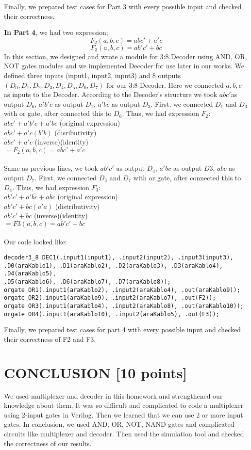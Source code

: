 \documentclass[pdftex,12pt,a4paper]{article}
\begin{document}
Finally, we prepared test cases for Part 3 with every possible input and checked their correctness. 

\textbf{In Part 4}, we had two expression;
\[F_2(a, b, c) = abc' + a'c\]
\[F_3(a, b, c) = ab'c'+ bc\]
In this section, we designed and wrote a module for 3:8 Decoder using AND, OR, NOT gates modules and we implemented Decoder for use later in our works. We defined three inputs (input1, input2, input3) and 8 outputs \((D_0, D_1, D_2, D_3, D_4, D_5, D_6, D_7)\) for our 3:8 Decoder. 
Here we connected \(a, b, c\) as inputs to the Decoder. According to the Decoder’s structure we took \(abc' \)as output \(D_6\), \(a' b'c\) as output \(D_1\), \(a' bc\) as output \(D_3\). First, we connected \(D_1\)  and \(D_3\)  with or gate, after connected this to \(D_6\). Thus, we had expression \(F_2\):\\
	\(abc' + a' b'c + a' bc\)		(original expression)\\
	\(abc' + a'c(b'b)\)					(disributivity)\\
	\(abc' + a'c \)					(inverse)(identity)\\
\(=F_2(a, b, c) = abc' + a'c\)	\\\\
Same as previous lines, we took \(ab'c'\) as output \(D_4\), \(a' bc\) as output \(D3\), \(abc\) as output \(D_7\). First, we connected \(D_3\) and \(D_7\) with or gate, after connected this to \(D_4\). Thus, we had expression \(F_3\):\\
\(ab'c'+ a'bc + abc\)			(original expression)\\
\(ab'c'+ bc(a'a)	\)			(distributivity)\\
\(ab'c'+ bc	\)			(inverse)(identity)\\
\(= 	F3(a, b, c) = ab'c'+ bc\)\\\\
 Our code looked like:

\begin{verbatim}
decoder3_8 DEC1(.input1(input1), .input2(input2), .input3(input3),
.D0(araKablo1), .D1(araKablo2), .D2(araKablo3), .D3(araKablo4), .D4(araKablo5),
.D5(araKablo6), .D6(araKablo7), .D7(araKablo8));
orgate OR1(.input1(araKablo2), .input2(araKablo4), .out(araKablo9));
orgate OR2(.input1(araKablo9), .input2(araKablo7), .out(F2));
orgate OR3(.input1(araKablo4), .input2(araKablo8), .out(araKablo10));
orgate OR4(.input1(araKablo10), .input2(araKablo5), .out(F3));
\end{verbatim}

Finally, we prepared test cases for part 4 with every possible input and checked their correctness of F2 and F3.

\section{CONCLUSION [10 points]}
We used multiplexer and decoder in this homework and strengthened our knowledge about them. It was so difficult and complicated to code a multiplexer using 2-input gates in Verilog. Then we learned that we can use 2 or more input gates. 
In conclusion, we used AND, OR, NOT, NAND gates and complicated circuits like multiplexer and decoder. Then used the simulation tool and checked the correctness of our results.

\newpage
\end{document}
